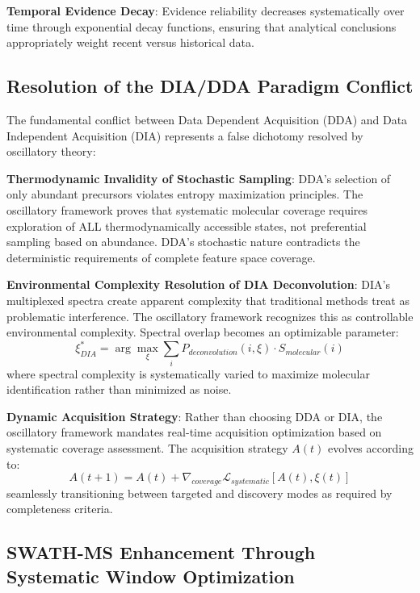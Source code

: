 \documentclass[11pt,a4paper]{article}
\begin{document}
\textbf{Temporal Evidence Decay}: Evidence reliability decreases systematically over time through exponential decay functions, ensuring that analytical conclusions appropriately weight recent versus historical data.

\subsection{Resolution of the DIA/DDA Paradigm Conflict}

The fundamental conflict between Data Dependent Acquisition (DDA) and Data Independent Acquisition (DIA) represents a false dichotomy resolved by oscillatory theory:

\textbf{Thermodynamic Invalidity of Stochastic Sampling}: DDA's selection of only abundant precursors violates entropy maximization principles. The oscillatory framework proves that systematic molecular coverage requires exploration of ALL thermodynamically accessible states, not preferential sampling based on abundance. DDA's stochastic nature contradicts the deterministic requirements of complete feature space coverage.

\textbf{Environmental Complexity Resolution of DIA Deconvolution}: DIA's multiplexed spectra create apparent complexity that traditional methods treat as problematic interference. The oscillatory framework recognizes this as controllable environmental complexity. Spectral overlap becomes an optimizable parameter:
\begin{equation}
\xi_{DIA}^* = \arg\max_\xi \sum_i P_{deconvolution}(i, \xi) \cdot S_{molecular}(i)
\end{equation}
where spectral complexity is systematically varied to maximize molecular identification rather than minimized as noise.

\textbf{Dynamic Acquisition Strategy}: Rather than choosing DDA or DIA, the oscillatory framework mandates real-time acquisition optimization based on systematic coverage assessment. The acquisition strategy $A(t)$ evolves according to:
\begin{equation}
A(t+1) = A(t) + \nabla_{coverage} \mathcal{L}_{systematic}[A(t), \xi(t)]
\end{equation}
seamlessly transitioning between targeted and discovery modes as required by completeness criteria.

\subsection{SWATH-MS Enhancement Through Systematic Window Optimization}
\end{document}
